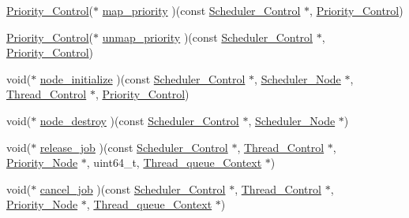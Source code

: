 \begin{DoxyCompactItemize}
\item 
\mbox{\hyperlink{group__RTEMSScorePriority_ga59d02b58072d31a9a1cfe644557aefe2}{Priority\+\_\+\+Control}}($\ast$ \mbox{\hyperlink{structScheduler__Operations_aea4436ee4fab8bbfea5f6c5dd7a89626}{map\+\_\+priority}} )(const \mbox{\hyperlink{struct__Scheduler__Control}{Scheduler\+\_\+\+Control}} $\ast$, \mbox{\hyperlink{group__RTEMSScorePriority_ga59d02b58072d31a9a1cfe644557aefe2}{Priority\+\_\+\+Control}})
\item 
\mbox{\hyperlink{group__RTEMSScorePriority_ga59d02b58072d31a9a1cfe644557aefe2}{Priority\+\_\+\+Control}}($\ast$ \mbox{\hyperlink{structScheduler__Operations_a0ae7a36d2d16869978fadd9c9852ae89}{unmap\+\_\+priority}} )(const \mbox{\hyperlink{struct__Scheduler__Control}{Scheduler\+\_\+\+Control}} $\ast$, \mbox{\hyperlink{group__RTEMSScorePriority_ga59d02b58072d31a9a1cfe644557aefe2}{Priority\+\_\+\+Control}})
\item 
void($\ast$ \mbox{\hyperlink{structScheduler__Operations_a9b86359bc31f966e7093f40ea0b10e0f}{node\+\_\+initialize}} )(const \mbox{\hyperlink{struct__Scheduler__Control}{Scheduler\+\_\+\+Control}} $\ast$, \mbox{\hyperlink{structScheduler__Node}{Scheduler\+\_\+\+Node}} $\ast$, \mbox{\hyperlink{struct__Thread__Control}{Thread\+\_\+\+Control}} $\ast$, \mbox{\hyperlink{group__RTEMSScorePriority_ga59d02b58072d31a9a1cfe644557aefe2}{Priority\+\_\+\+Control}})
\item 
void($\ast$ \mbox{\hyperlink{structScheduler__Operations_a97192f2e0cbd200bcc9dbbc76eb6b994}{node\+\_\+destroy}} )(const \mbox{\hyperlink{struct__Scheduler__Control}{Scheduler\+\_\+\+Control}} $\ast$, \mbox{\hyperlink{structScheduler__Node}{Scheduler\+\_\+\+Node}} $\ast$)
\item 
void($\ast$ \mbox{\hyperlink{structScheduler__Operations_a4666ee944118828f44b69a218d200c65}{release\+\_\+job}} )(const \mbox{\hyperlink{struct__Scheduler__Control}{Scheduler\+\_\+\+Control}} $\ast$, \mbox{\hyperlink{struct__Thread__Control}{Thread\+\_\+\+Control}} $\ast$, \mbox{\hyperlink{structPriority__Node}{Priority\+\_\+\+Node}} $\ast$, uint64\+\_\+t, \mbox{\hyperlink{structThread__queue__Context}{Thread\+\_\+queue\+\_\+\+Context}} $\ast$)
\item 
void($\ast$ \mbox{\hyperlink{structScheduler__Operations_a10f2951309665f4c7bc5270d35224437}{cancel\+\_\+job}} )(const \mbox{\hyperlink{struct__Scheduler__Control}{Scheduler\+\_\+\+Control}} $\ast$, \mbox{\hyperlink{struct__Thread__Control}{Thread\+\_\+\+Control}} $\ast$, \mbox{\hyperlink{structPriority__Node}{Priority\+\_\+\+Node}} $\ast$, \mbox{\hyperlink{structThread__queue__Context}{Thread\+\_\+queue\+\_\+\+Context}} $\ast$)

\end{DoxyCompactItemize}
